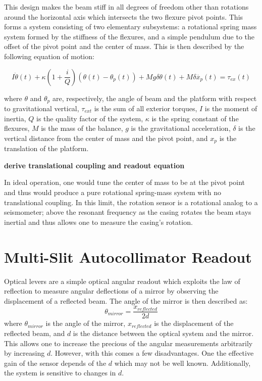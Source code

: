 \documentclass [12pt, proquest]{uwthesis}[2019]
\begin{document}
This design makes the beam stiff in all degrees of freedom other than rotations around the horizontal axis which intersects the two flexure pivot points. This forms a system consisting of two elementary subsystems: a rotational spring mass system formed by the stiffness of the flexures, and a simple pendulum due to the offset of the pivot point and the center of mass. This is then described by the following equation of motion: \cite{venk2014}

\[I \ddot{\theta}(t)+\kappa (1+ \frac{i}{Q})(\theta(t)-\theta_p(t))+M g \delta \theta(t) +M \delta \ddot{x_p}(t)=\tau_{ex}(t)\]

where $\theta$ and $\theta_p$ are, respectively, the angle of beam and the platform with respect to gravitational vertical, $\tau_{ext}$ is the sum of all exterior torques, $I$ is the moment of inertia, $Q$ is the quality factor of the system, $\kappa$ is the spring constant of the flexures, $M$ is the mass of the balance, $g$ is the gravitational acceleration, $\delta$ is the vertical distance from the center of mass and the pivot point, and $x_p$ is the translation of the platform.

\textbf{derive translational coupling and readout equation}

In ideal operation, one would tune the center of mass to be at the pivot point and thus would produce a pure rotational spring-mass system with no translational coupling. In this limit, the rotation sensor is a rotational analog to a seismometer; above the resonant frequency as the casing rotates the beam stays inertial and thus allows one to measure the casing's rotation.

\section{Multi-Slit Autocollimator Readout}

\quad Optical levers are a simple optical angular readout which exploits the law of reflection to measure angular deflections of a mirror by observing the displacement of a reflected beam. The angle of the mirror is then described as:
\[\theta_{mirror}=\frac{x_{reflected}}{2d}\]
where $\theta_{mirror}$ is the angle of the mirror, $x_{reflected}$ is the displacement of the reflected beam, and $d$ is the distance between the optical system and the mirror. This allows one to increase the precious of the angular measurements arbitrarily by increasing $d$. However, with this comes a few disadvantages. One the effective gain of the sensor depends of the $d$ which may not be well known. Additionally, the system is sensitive to changes in $d$. 
\end{document}
